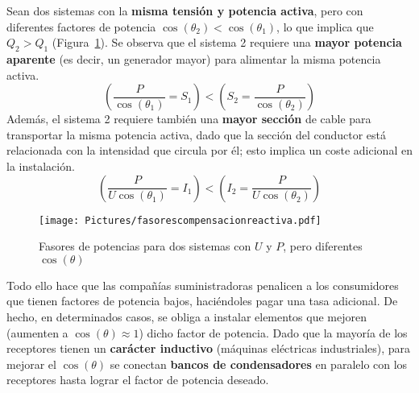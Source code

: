 \documentclass[11pt]{book} %
\numberwithin{dummy}{section}
\theoremstyle{ocrenumbox}
\theoremstyle{blacknumex}
\theoremstyle{blacknumbox}
\theoremstyle{ocrenum}
\begin{document}
	Sean dos sistemas con la \textbf{misma tensión y potencia activa}, pero con diferentes factores de potencia $\cos(\theta_2) < \cos(\theta_1)$, lo que implica que $Q_2 > Q_1$ (Figura~\ref{fig.fasorescompensacionreactiva}). Se observa que el sistema 2 requiere una \textbf{mayor potencia aparente} (es decir, un generador mayor) para alimentar la misma potencia activa.
	\begin{equation*}
		\left(\dfrac{P}{\cos(\theta_1)} = S_1 \right) < \left( S_2 = \dfrac{P}{\cos (\theta_2)}\right) 
	\end{equation*}
	Además, el sistema 2 requiere también una \textbf{mayor sección} de cable para transportar la misma potencia activa, dado que la sección del conductor está relacionada con la intensidad que circula por él; esto implica un coste adicional en la instalación.
	\begin{equation*}
		\left(\frac{P}{U \cos (\theta_1)} = I_1 \right) < \left( I_2 = \frac{P}{U \cos (\theta_2)}\right) 
	\end{equation*}
	\begin{figure}[htbp]
		\centering
		\texttt{[image: Pictures/fasorescompensacionreactiva.pdf]}
		\caption{Fasores de potencias para dos sistemas con $U$ y $P$, pero diferentes $\cos(\theta)$}
		\label{fig.fasorescompensacionreactiva}
	\end{figure} 
	
	Todo ello hace que las compañías suministradoras penalicen a los consumidores que tienen factores de potencia bajos, haciéndoles pagar una tasa adicional. De hecho, en determinados casos, se obliga a instalar elementos que mejoren (aumenten a $\cos(\theta)\approx 1$) dicho factor de potencia. Dado que la mayoría de los receptores tienen un \textbf{carácter inductivo} (máquinas eléctricas industriales), para mejorar el $\cos(\theta)$ se conectan \textbf{bancos de condensadores} en paralelo con los receptores hasta lograr el factor de potencia deseado.
	
\end{document}

